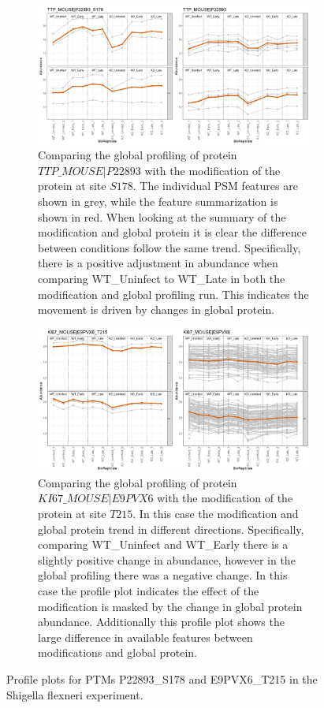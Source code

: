 \documentclass[mcp]{article}
\numberwithin{figure}{section} %
\numberwithin{table}{section}
\begin{document}
\begin{figure}[h!]
\centering
\begin{subfigure}{\textwidth}
 \centering
	\includegraphics[width=.95\textwidth]{images/No_Difference_Shigella_Profile_Plot}
	\caption{Comparing the global profiling of protein $TTP\_MOUSE|P22893$ with the modification of the protein at site $S178$. The individual PSM features are shown in grey, while the feature summarization is shown in red. When looking at the summary of the modification and global protein it is clear the difference between conditions follow the same trend. Specifically, there is a positive adjustment in abundance when comparing WT\_Uninfect to WT\_Late in both the modification and global profiling run. This indicates the movement is driven by changes in global protein.}
 \end{subfigure}\vspace{5mm}
 \begin{subfigure}{\textwidth}
 \centering
	\includegraphics[width=.95\textwidth]{images/Difference_Shigella_Profile_Plot}
	\caption{Comparing the global profiling of protein $KI67\_MOUSE|E9PVX6$ with the modification of the protein at site $T215$. In this case the modification and global protein trend in different directions. Specifically, comparing WT\_Uninfect and WT\_Early there is a slightly positive change in abundance, however in the global profiling there was a negative change. In this case the profile plot indicates the effect of the modification is masked by the change in global protein abundance. Additionally this profile plot shows the large difference in available features between modifications and global protein.}
 \end{subfigure}
\caption{Profile plots for PTMs P22893\_S178 and E9PVX6\_T215 in the Shigella flexneri experiment.}
\label{fig:shigella_profile}
\end{figure}
\end{document}
